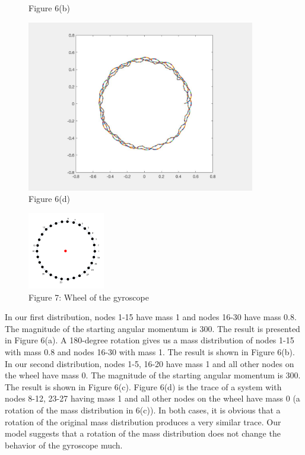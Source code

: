 \documentclass[12pt]{article}
\renewcommand{\(}{\left (}
\renewcommand{\)}{\right )}
\begin{document}
\begin{figure}[ht]
\begin{minipage}{0.5\textwidth}
		\caption*{\small Figure 6(b)}
	\end{minipage}
	\begin{minipage}{0.5\textwidth}
		\centering
		\includegraphics[width=0.89\textwidth]{uneven_trisection_rotation.jpg}
		\caption*{\small Figure 6(d)}
	\end{minipage}
\end{figure}

\begin{figure} [ht]
    \centering
    \includegraphics[width=0.3\textwidth]{masses_demo.png}
    \caption*{Figure 7: Wheel of the gyroscope}
    \label{fig:my_label}
\end{figure}

\vspace{\baselineskip}
In our first distribution, nodes 1-15 have mass 1 and nodes 16-30 have mass 0.8. The magnitude of the starting angular momentum is 300. The result is presented in Figure 6(a). A 180-degree rotation gives us a mass distribution of nodes 1-15 with mass 0.8 and nodes 16-30 with mass 1. The result is shown in Figure 6(b). In our second distribution, nodes 1-5, 16-20 have mass 1 and all other nodes on the wheel have mass 0. The magnitude of the starting angular momentum is 300. The result is shown in Figure 6(c). Figure 6(d) is the trace of a system with nodes 8-12, 23-27 having mass 1 and all other nodes on the wheel have mass 0 (a rotation of the mass distribution in 6(c)). In both cases, it is obvious that a rotation of the original mass distribution produces a very similar trace. Our model suggests that a rotation of the mass distribution does not change the behavior of the gyroscope much.
\end{document}
